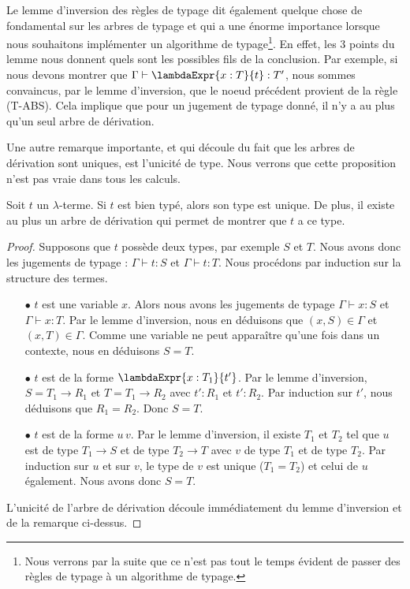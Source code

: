Le lemme d'inversion des règles de typage dit également quelque chose de
fondamental sur les arbres de typage et qui a une énorme importance lorsque
nous souhaitons implémenter un algorithme de typage\footnote{Nous verrons par la
suite que ce n'est pas tout le temps évident de passer des règles de typage à un
algorithme de typage.}. En effet, les 3 points du
lemme nous donnent quels sont les possibles fils de la conclusion. Par
exemple, si nous devons montrer que $\Gamma \vdash \lambdaExpr{x : T}{t} : T'$,
nous sommes convaincus, par le lemme d'inversion, que le noeud précédent
provient de la règle (T-ABS). Cela implique que pour un jugement de typage
donné, il n'y a au plus qu'un seul arbre de dérivation.

Une autre remarque importante, et qui découle du fait que les arbres de
dérivation sont uniques, est l'unicité de type. Nous verrons que cette
proposition n'est pas vraie dans tous les calculs.

\begin{theorem} 
  \label{thm:simply-typed-lambda-calculus-type-unicity}
  Soit $t$ un $\lambda$-terme. Si $t$ est bien typé, alors son type est unique.
  De plus, il existe au plus un arbre de dérivation qui permet de montrer que $t$
  a ce type.
\end{theorem}

\begin{proof}
  \label{proof:simply-typed-lambda-calculus-type-unicity}
  Supposons que $t$ possède deux types, par exemple $S$ et $T$. Nous avons donc les
  jugements de typage : $\Gamma \vdash t : S$ et $\Gamma \vdash t : T$. Nous procédons
  par induction sur la structure des termes.
  \begin{itemize}
   \item[$\bullet$] $t$ est une variable $x$. Alors nous avons les jugements de typage
     $\Gamma \vdash x : S$ et $\Gamma \vdash x : T$. Par le lemme d'inversion, nous
     en déduisons que $(x, S) \in
     \Gamma$ et $(x, T) \in \Gamma$. Comme une variable ne peut apparaître
     qu'une fois dans un contexte, nous en déduisons $S = T$.

   \item[$\bullet$] $t$ est de la forme $\lambdaExpr{x : T_{1}}{t'}$. Par le lemme
     d'inversion, $S = T_{1} \rightarrow R_{1}$ et $T = T_{1} \rightarrow
     R_{2}$ avec $t' : R_{1}$ et $t' : R_{2}$. Par induction sur $t'$, nous
     déduisons que $R_{1} = R_{2}$. Donc $S = T$.

   \item[$\bullet$] $t$ est de la forme $u \, v$. Par le lemme d'inversion, il existe
     $T_{1}$ et $T_{2}$ tel que $u$ est de type $T_{1} \rightarrow S$ et de type $T_{2}
     \rightarrow T$ avec $v$ de type $T_{1}$ et de type $T_{2}$. Par induction
     sur $u$ et sur $v$, le type de $v$ est unique ($T_{1} = T_{2}$) et celui
     de $u$ également. Nous avons donc $S = T$.
   \end{itemize}

   L'unicité de l'arbre de dérivation découle immédiatement du lemme d'inversion
   et de la remarque ci-dessus.
\end{proof}


